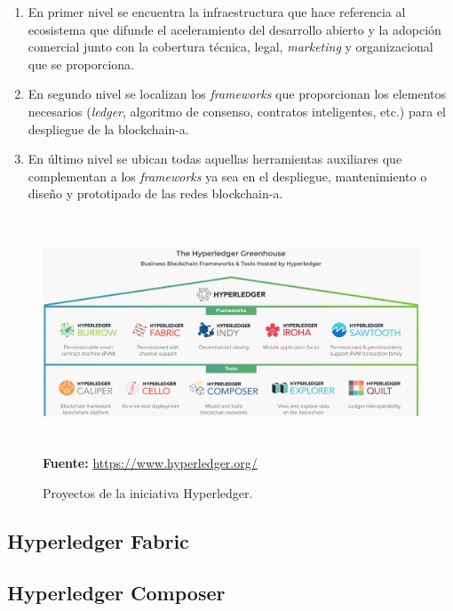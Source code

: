 \documentclass[12pt,a4paper, twoside]{report}
\begin{document}
	\begin{enumerate}
		\item En primer nivel se encuentra la infraestructura que hace referencia al ecosistema que difunde el aceleramiento del desarrollo abierto y la adopción comercial junto con la cobertura técnica, legal, \textit{marketing} y organizacional que se proporciona.
		\item En segundo nivel se localizan los \textit{\glspl{framework}} que proporcionan los elementos necesarios (\textit{ledger}, algoritmo de consenso, contratos inteligentes, etc.) para el despliegue de la \gls{blockchain-a}.
		\item En último nivel se ubican todas aquellas herramientas 	auxiliares que complementan a los \textit{\glspl{framework}} ya sea en el despliegue, mantenimiento o diseño y prototipado de las redes \gls{blockchain-a}. 
	\end{enumerate}
	
	 \begin{figure}[!ht]   
		\caption{Proyectos de la iniciativa Hyperledger.} 
		\begin{center} 
			\includegraphics[width=16cm,height=7cm]{Images/stateArt/hyperledger} \\
			\label{fig:stateArt_hyperledger} 
			\textbf{Fuente:} \url{https://www.hyperledger.org/}
		\end{center}  
	\end{figure}
	
	\subsection{Hyperledger Fabric}
		
	\subsection{Hyperledger Composer}
\end{document}
